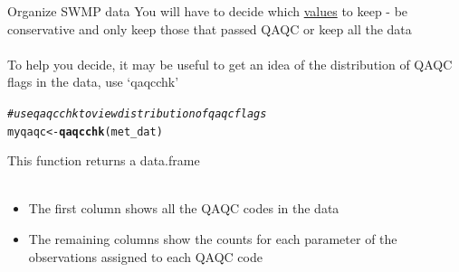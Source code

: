 \documentclass[xcolor=svgnames]{beamer}\usepackage[]{graphicx}\usepackage[]{color}
\makeatletter
\newcommand{\hlcom}[1]{\textcolor[rgb]{0.678,0.584,0.686}{\textit{#1}}}%
\newcommand{\hlstd}[1]{\textcolor[rgb]{0.345,0.345,0.345}{#1}}%
\newcommand{\hlkwb}[1]{\textcolor[rgb]{0.69,0.353,0.396}{#1}}%
\newcommand{\hlkwd}[1]{\textcolor[rgb]{0.737,0.353,0.396}{\textbf{#1}}}%
\newenvironment{kframe}{%
 \def\at@end@of@kframe{}%
 \ifinner\ifhmode%
  \def\at@end@of@kframe{\end{minipage}}%
  \begin{minipage}{\columnwidth}%
 \fi\fi%
 \def\FrameCommand##1{\hskip\@totalleftmargin \hskip-\fboxsep
 \colorbox{shadecolor}{##1}\hskip-\fboxsep
     \hskip-\linewidth \hskip-\@totalleftmargin \hskip\columnwidth}%
 \MakeFramed {\advance\hsize-\width
   \@totalleftmargin\z@ \linewidth\hsize
   \@setminipage}}%
 {\par\unskip\endMakeFramed%
 \at@end@of@kframe}
\newenvironment{knitrout}{}{} %
\makeatother
\begin{document}
\begin{frame}[containsverbatim]{Organize SWMP data}
You will have to decide which \href{http://cdmo.baruch.sc.edu/data/qaqc.cfm}{values} to keep - be conservative and only keep those that passed QAQC or keep all the data \\~\\
To help you decide, it may be useful to get an idea of the distribution of QAQC flags in the data, use `qaqcchk'
\begin{knitrout}\scriptsize
{}\color{fgcolor}\begin{kframe}
\begin{alltt}
\hlcom{# use qaqcchk to view distribution of qaqc flags}
\hlstd{myqaqc} \hlkwb{<-} \hlkwd{qaqcchk}\hlstd{(met_dat)}
\end{alltt}
\end{kframe}
\end{knitrout}
This function returns a data.frame\\~\\
\begin{itemize}
\item The first column shows all the QAQC codes in the data
\item The remaining columns show the counts for each parameter of the observations assigned to each QAQC code
\end{itemize}
\end{frame}
\end{document}
